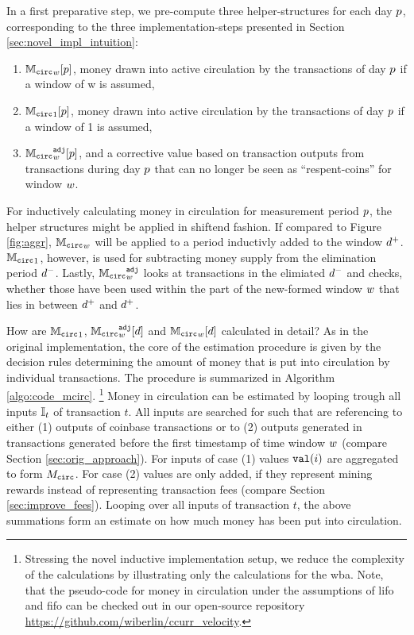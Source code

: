 In a first preparative step, we pre-compute three helper-structures for each day \({p}\), corresponding to the three implementation-steps presented in Section \ref{sec:novel_impl_intuition}:
\begin{enumerate}
\item \( {{\mathbb{M}_{\mathtt{circ}}}_{{w}}}[{p}] \), money drawn into active circulation by the transactions of day \({p}\) if a window of w is assumed,
\item \( {\mathbb{M}_{\mathtt{circ}}}_{1}[{p}] \), money drawn into active circulation by the transactions of day \( {p} \) if a window of 1 is assumed,
\item \( {{\mathbb{M}_{\mathtt{circ}}}^{\mathtt{adj}}_{{w}}}[{p}] \), and a corrective value based on transaction outputs from transactions during day \({p}\) that can no longer be seen as ``respent-coins'' for window \({w}\).  
\end{enumerate}
For inductively calculating money in circulation for measurement period \({p}\), the helper structures might be applied in shiftend fashion. %
If compared to Figure \ref{fig:aggr}, \( {{\mathbb{M}_{\mathtt{circ}}}_{{w}}} \) will be applied to a period inductivly added to the window \({d^{+}}\). %
\( {\mathbb{M}_{\mathtt{circ}}}_{1}\), however, is used for subtracting money supply from the elimination period \({d^{-}}\). %
Lastly, \( {{\mathbb{M}_{\mathtt{circ}}}^{\mathtt{adj}}_{{w}}} \) looks at transactions in the elimiated \({d^{-}}\) and checks, whether those have been used within the part of the new-formed window \({w}\) that lies in between \({d^{+}}\) and \({d^{+}}\). %


How are \({\mathbb{M}_{\mathtt{circ}}}_{1}\), \( {{\mathbb{M}_{\mathtt{circ}}}^{\mathtt{adj}}_{{w}}}[d] \) and \( {{\mathbb{M}_{\mathtt{circ}}}_{{w}}}[d] \) calculated in detail? %
As in the original implementation, the core of the estimation procedure is given by the decision rules determining the amount of money that is put into circulation by individual transactions. %
The procedure is summarized in Algorithm \ref{algo:code_mcirc}.%
\footnote{Stressing the novel inductive implementation setup, we reduce the complexity of the calculations by illustrating only the calculations for the \ac{wba}. %
Note, that the pseudo-code for money in circulation under the assumptions of \ac{lifo} and \ac{fifo} can be checked out in our open-source repository \url{https://github.com/wiberlin/ccurr_velocity}.
} %
Money in circulation can be estimated by looping trough all inputs \({\mathbb{I}}_{t}\) of transaction \(t\). %
All inputs are searched for such that are referencing to either (1) outputs of coinbase transactions or to (2) outputs generated in transactions generated before the first timestamp of time window \({w}\) (compare Section \ref{sec:orig_approach}). %
For inputs of case (1) values \({\mathtt{val}}(i)\) are aggregated to form \({M_{\mathtt{circ}}}\). %
For case (2) values are only added, if they represent mining rewards instead of representing transaction fees (compare Section \ref{sec:improve_fees}). %
Looping over all inputs of transaction \(t\), the above summations form an estimate on how much money has been put into circulation. %

